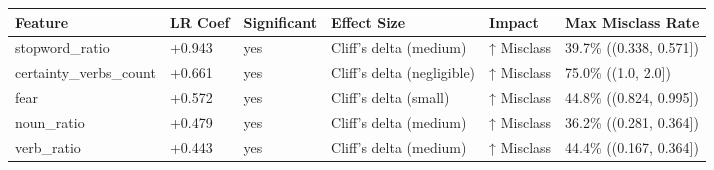 \begin{tabular}{llllll}
\toprule
Feature & LR Coef & Significant & Effect Size & Impact & Max Misclass Rate \\
\midrule
stopword\_ratio & +0.943 & yes & Cliff's delta (medium) & ↑ Misclass & 39.7\% ((0.338, 0.571]) \\
certainty\_verbs\_count & +0.661 & yes & Cliff's delta (negligible) & ↑ Misclass & 75.0\% ((1.0, 2.0]) \\
fear & +0.572 & yes & Cliff's delta (small) & ↑ Misclass & 44.8\% ((0.824, 0.995]) \\
noun\_ratio & +0.479 & yes & Cliff's delta (medium) & ↑ Misclass & 36.2\% ((0.281, 0.364]) \\
verb\_ratio & +0.443 & yes & Cliff's delta (medium) & ↑ Misclass & 44.4\% ((0.167, 0.364]) \\
\bottomrule
\end{tabular}
